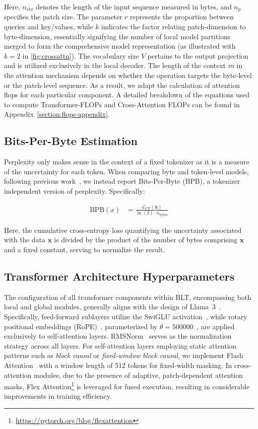Here, $n_{ctx}$ denotes the length of the input sequence measured in bytes, and $n_p$ specifies the patch size. The parameter $r$ represents the proportion between queries and key/values, while $k$ indicates the factor relating patch-dimension to byte-dimension, essentially signifying the number of local model partitions merged to form the comprehensive model representation (as illustrated with $k=2$ in \autoref{fig:crossattn}). The vocabulary size $V$ pertains to the output projection and is utilized exclusively in the local decoder. The length of the context $m$ in the attention mechanism depends on whether the operation targets the byte-level or the patch-level sequence. As a result, we adapt the calculation of attention flops for each particular component. A detailed breakdown of the equations used to compute Transformer-FLOPs and Cross-Attention FLOPs can be found in Appendix~\ref{section:flops-appendix}.

\subsection{Bits-Per-Byte Estimation} Perplexity only makes sense in the context of a fixed tokenizer as it is a measure of the uncertainty for each token. When comparing byte and token-level models, following previous work~\citep{xue2022byt5, yu2023megabyte, wang2024mambabyte}, we instead report Bits-Per-Byte (BPB), a tokenizer independent version of perplexity. Specifically:

\begin{align}
    \text{BPB}(x)&= \frac{\mathcal{L}_{CE}(\pmb{x})}{\ln(2)\cdot n_{\text{bytes}}}
\end{align}

Here, the cumulative cross-entropy loss quantifying the uncertainty associated with the data $\pmb{x}$ is divided by the product of the number of bytes comprising $\pmb{x}$ and a fixed constant, serving to normalize the result.

\subsection{Transformer Architecture Hyperparameters} The configuration of all transformer components within {\textsc BLT}, encompassing both local and global modules, generally aligns with the design of Llama~3~\citep{dubey2024llama}. Specifically, feed-forward sublayers utilize the SwiGLU activation~\citep{swiglu}, while rotary positional embeddings (RoPE)~\citep{RoPe}, parameterized by $\theta=500000$~\citep{xiong2024effective}, are applied exclusively to self-attention layers. RMSNorm~\citep{RMSNorm} serves as the normalization strategy across all layers. For self-attention layers employing static attention patterns such as \textit{block causal} or \textit{fixed-window block causal}, we implement Flash Attention~\citep{dao2022flashattention} with a window length of 512 tokens for fixed-width masking. In cross-attention modules, due to the presence of adaptive, patch-dependent attention masks, Flex Attention\footnote{\url{https://pytorch.org/blog/flexattention}} is leveraged for fused execution, resulting in considerable improvements in training efficiency.

